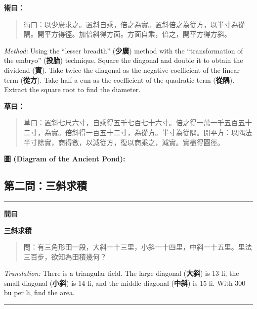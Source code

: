 \documentclass[11pt,a4paper]{article}
\newenvironment{problem}[1][]{%
  \medskip\noindent\rule{\textwidth}{0.4pt}%
  \par\noindent\textbf{\color{sectioncolor}#1}\par\nopagebreak%
  \smallskip%
}{%
  \par\noindent\rule{\textwidth}{0.4pt}\medskip%
}
\newenvironment{method}{%
  \medskip\noindent{\color{methodcolor}\rule{0.5\textwidth}{0.5pt}}%
  \par\color{methodcolor}%
}{%
  \par\medskip%
}
\begin{document}
\begin{method}
\textbf{術曰：}

\begin{quote}
\textcolor{chinacolor}{%
術曰：以少廣求之。置斜自乘，倍之為實。置斜倍之為從方，以半寸為從隅。開平方得徑。加倍斜得方面。方面自乘，倍之，開平方得方斜。
}
\end{quote}

\textit{Method:} Using the ``lesser breadth'' (\textbf{少廣}) method with the 
``transformation of the embryo'' (\textbf{投胎}) technique. Square the diagonal 
and double it to obtain the dividend (\textbf{實}). Take twice the diagonal as the 
negative coefficient of the linear term (\textbf{從方}). Take half a cun as the 
coefficient of the quadratic term (\textbf{從隅}). Extract the square root to find 
the diameter.
\end{method}

\noindent\textbf{\color{notecolor}草曰：}
\begin{quote}
\textcolor{chinacolor}{%
草曰：置斜七尺六寸，自乘得五千七百七十六寸。倍之得一萬一千五百五十二寸，為實。倍斜得一百五十二寸，為從方。半寸為從隅。開平方：以隅法半寸除實，商得數，以減從方，復以商乘之，減實。實盡得圓徑。
}
\end{quote}

\noindent\textbf{圖 (Diagram of the Ancient Pond):}
\begin{center}
\end{center}

\subsection*{第二問：三斜求積}

\begin{problem}[\textbf{問曰}]
\textbf{\color{sectioncolor}三斜求積}

\begin{quote}
\textcolor{chinacolor}{%
問：有三角形田一段，大斜一十三里，小斜一十四里，中斜一十五里。里法三百步，欲知為田積幾何？
}
\end{quote}

\textit{Translation:} There is a triangular field. The large diagonal 
(\textbf{大斜}) is 13 li, the small diagonal (\textbf{小斜}) is 14 li, and the middle 
diagonal (\textbf{中斜}) is 15 li. With 300 bu per li, find the area.
\end{problem}
\end{document}
